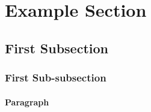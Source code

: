 %
%

\section{Example Section} \label{sec_example_section}

\lipsum[3]



%
%

\subsection{First Subsection} \label{sec_first_subsection}

\lipsum[4]



%
%

\subsubsection{First Sub-subsection}

\lipsum[5]



%
%

\paragraph{Paragraph}

\lipsum[6]




